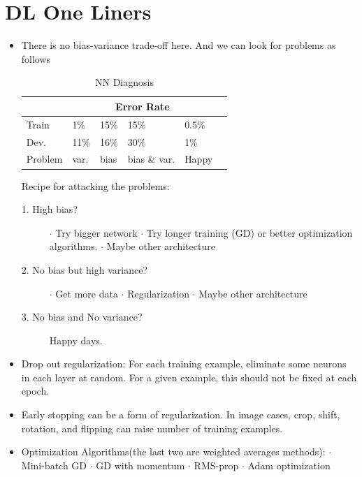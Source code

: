 \section{DL One Liners}
\begin{itemize}
\item There is no bias-variance trade-off here. And we can look for problems as follows
\begin{table}[h!]
\caption{NN Diagnosis} \label{tab:NNDiagnosis}
\begin{tabular}{|l|l|l|l|l|l|}
\hline
\rowcolor{shadecolor} {\cellcolor{black} } & \multicolumn{4}{c|}{Error Rate}  \\ 
\hline
Train & 1\% & 15\%  & 15\% & 0.5\%  \\ 
\hline
\rowcolor{aliceblue} 
Dev. & 11\%  & 16\%   & 30\% & 1\%    \\ \hline
Problem & var. & bias & bias \& var. & Happy  \\ \hline
\end{tabular}
\end{table}

Recipe for attacking the problems:
\begin{description}
\item [1. High bias?] 
$\boldsymbol \cdot $ Try bigger network
$\boldsymbol \cdot $ Try longer training (GD) or better optimization algorithms.
$\boldsymbol \cdot $ Maybe other architecture

\item [2. No bias but high variance?] 
$\boldsymbol \cdot $ Get more data
$\boldsymbol \cdot $ Regularization
$\boldsymbol \cdot $ Maybe other architecture

\item [3. No bias and No variance?] Happy days.
\end{description}

\item Drop out regularization: For each training example, eliminate some neurons 
in each layer at random. For a given example, this should not be fixed at each epoch.

\item Early stopping can be a form of regularization. In image cases, crop, shift, rotation, 
and flipping can raise number of training examples.

\item Optimization Algorithms(the last two are weighted averages methods): 
$\boldsymbol \cdot $ Mini-batch GD
$\boldsymbol \cdot $ GD with momentum
$\boldsymbol \cdot $ RMS-prop
$\boldsymbol \cdot $ Adam optimization

\end{itemize}




